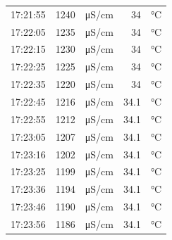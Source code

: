 \documentclass[11pt]{article}
\begin{document}
\begin{enumerate}
\begin{center}
\begin{tabular}{l|lp{3cm}r|l}
17:21:55 & 1240 & μS/cm & 34 & °C\\
17:22:05 & 1235 & μS/cm & 34 & °C\\
17:22:15 & 1230 & μS/cm & 34 & °C\\
17:22:25 & 1225 & μS/cm & 34 & °C\\
17:22:35 & 1220 & μS/cm & 34 & °C\\
17:22:45 & 1216 & μS/cm & 34.1 & °C\\
17:22:55 & 1212 & μS/cm & 34.1 & °C\\
17:23:05 & 1207 & μS/cm & 34.1 & °C\\
17:23:16 & 1202 & μS/cm & 34.1 & °C\\
17:23:25 & 1199 & μS/cm & 34.1 & °C\\
17:23:36 & 1194 & μS/cm & 34.1 & °C\\
17:23:46 & 1190 & μS/cm & 34.1 & °C\\
17:23:56 & 1186 & μS/cm & 34.1 & °C\\
\end{tabular}
\end{center}


\end{enumerate}
\end{document}
